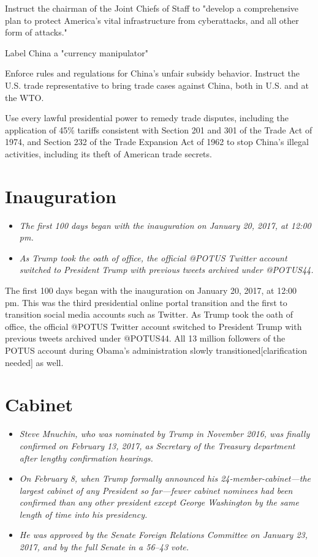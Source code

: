 Instruct the chairman of the Joint Chiefs of Staff to "develop a
comprehensive plan to protect America's vital infrastructure from
cyberattacks, and all other form of attacks."

Label China a "currency manipulator"

Enforce rules and regulations for China's unfair subsidy behavior.
Instruct the U.S. trade representative to bring trade cases against
China, both in U.S. and at the WTO.

Use every lawful presidential power to remedy trade disputes, including
the application of 45\% tariffs consistent with Section 201 and 301 of
the Trade Act of 1974, and Section 232 of the Trade Expansion Act of
1962 to stop China's illegal activities, including its theft of American
trade secrets.

\section{Inauguration}\label{inauguration}

\begin{itemize}
\item
  \emph{The first 100 days began with the inauguration on January 20,
  2017, at 12:00 pm.}
\item
  \emph{As Trump took the oath of office, the official @POTUS Twitter
  account switched to President Trump with previous tweets archived
  under @POTUS44.}
\end{itemize}

The first 100 days began with the inauguration on January 20, 2017, at
12:00 pm. This was the third presidential online portal transition and
the first to transition social media accounts such as Twitter. As Trump
took the oath of office, the official @POTUS Twitter account switched to
President Trump with previous tweets archived under @POTUS44. All 13
million followers of the POTUS account during Obama's administration
slowly transitioned{[}clarification needed{]} as well.

\section{Cabinet}\label{cabinet}

\begin{itemize}
\item
  \emph{Steve Mnuchin, who was nominated by Trump in November 2016, was
  finally confirmed on February 13, 2017, as Secretary of the Treasury
  department after lengthy confirmation hearings.}
\item
  \emph{On February 8, when Trump formally announced his
  24-member-cabinet---the largest cabinet of any President so
  far---fewer cabinet nominees had been confirmed than any other
  president except George Washington by the same length of time into his
  presidency.}
\item
  \emph{He was approved by the Senate Foreign Relations Committee on
  January 23, 2017, and by the full Senate in a 56--43 vote.}
\end{itemize}

